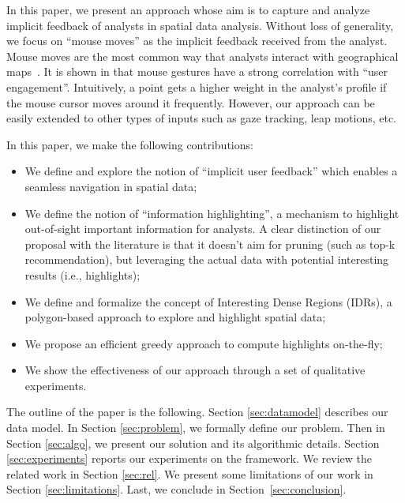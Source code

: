 \documentclass[sigconf,edbt]{acmart-edbt2019}
\begin{document}
\vspace{2pt}
In this paper, we present an approach whose aim is to capture and analyze implicit feedback of analysts in spatial data analysis. Without loss of generality, we focus on ``mouse moves'' as the implicit feedback received from the analyst. Mouse moves are the most common way that analysts interact with geographical maps~\cite{Chen:2001}. It is shown in \cite{Arapakis:2014} that mouse gestures have a strong correlation with ``user engagement''. Intuitively, a point gets a higher weight in the analyst's profile if the mouse cursor moves around it frequently.  However, our approach can be easily extended to other types of inputs such as gaze tracking, leap motions, etc.

\vspace{2pt}
 In this paper, we make the following contributions:

\begin{itemize}[leftmargin=*]
  \item We define and explore the notion of ``implicit user feedback'' which enables a seamless navigation in spatial data;
  \item We define the notion of ``information highlighting'', a mechanism to highlight out-of-sight important information for analysts. A clear distinction of our proposal with the literature is that it doesn't aim for pruning (such as top-k recommendation), but leveraging the actual data with potential interesting results (i.e., highlights);
  \item  We define and formalize the concept of Interesting Dense Regions (IDRs), a polygon-based approach to explore and highlight spatial data;
  \item We propose an efficient greedy approach to compute highlights on-the-fly;
  \item We show the effectiveness of our approach through a set of qualitative experiments.
\end{itemize}  

\vspace{2pt}
The outline of the paper is the following. Section \ref{sec:datamodel} describes our data model. In Section \ref{sec:problem}, we formally define our problem. Then in Section \ref{sec:algo}, we present our solution and its algorithmic details. Section  \ref{sec:experiments} reports our experiments on the framework. We review the related work in Section \ref{sec:rel}. We present some limitations of our work in Section \ref{sec:limitations}. Last, we conclude in Section~\ref{sec:conclusion}.
\end{document}
